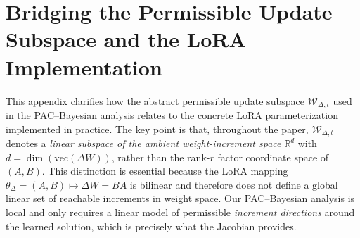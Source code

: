 \documentclass{article}
\theoremstyle{plain}
\theoremstyle{definition}
\theoremstyle{remark}
\begin{document}
\section{Bridging the Permissible Update Subspace and the LoRA Implementation}
\label{app:lora_subspace_bridge}

This appendix clarifies how the abstract permissible update subspace
$\mathcal W_{\Delta,t}$ used in the PAC--Bayesian analysis relates to the concrete LoRA
parameterization implemented in practice.
The key point is that, throughout the paper, $\mathcal W_{\Delta,t}$ denotes a
\emph{linear subspace of the ambient weight-increment space} $\mathbb R^d$ with
$d=\dim(\mathrm{vec}(\Delta W))$, rather than the rank-$r$ factor coordinate space of $(A,B)$.
This distinction is essential because the LoRA mapping $\theta_\Delta=(A,B)\mapsto \Delta W=BA$
is bilinear and therefore does not define a global linear set of reachable increments in weight space.
Our PAC--Bayesian analysis is local and only requires a linear model of permissible \emph{increment directions}
around the learned solution, which is precisely what the Jacobian provides.

\end{document}
